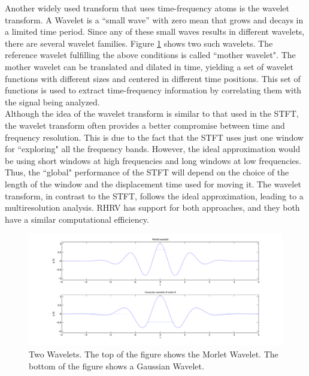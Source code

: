 \documentclass[12pt,lot, lof]{puthesis}
\begin{document}
Another widely used transform that uses time-frequency atoms is the wavelet 
transform. A Wavelet is a ``small wave'' with zero mean that grows and decays 
in a limited time period. Since any of these small waves results in different 
wavelets, there are several wavelet families. Figure \ref{fig:wavelets} shows 
two such wavelets. The reference wavelet fulfilling the above conditions is 
called ``mother wavelet". The mother wavelet can be translated and dilated in 
time, yielding a set of wavelet functions with different sizes and centered in 
different time positions.  This set of functions is used to extract 
time-frequency information by correlating them with the signal being analyzed.\\

Although the idea of the wavelet transform is similar to that used in the 
\gls{STFT},  the wavelet transform often provides a better compromise between 
time and frequency resolution. This is due to the fact that the \gls{STFT} uses 
just one window for ``exploring" all the frequency bands. However, the ideal 
approximation would be using short windows at high frequencies and long windows 
at low frequencies. Thus, the ``global" performance of the \gls{STFT} will 
depend on the choice of the length of the window and the displacement time used 
for moving it. The wavelet transform, in contrast to the \gls{STFT}, follows 
the ideal approximation, leading to a multiresolution analysis. RHRV has 
support for both approaches, and they both have a similar computational 
efficiency.\\


\begin{figure}[ht]
\begin{center}
\includegraphics[scale=0.6]{figures/basicWavelets2.png}
\caption[Two Wavelets]{\label{fig:wavelets} Two Wavelets. The top of the figure 
shows the Morlet Wavelet. The bottom of the figure shows a Gaussian Wavelet.}
\end{center}
\end{figure} 
\end{document}
